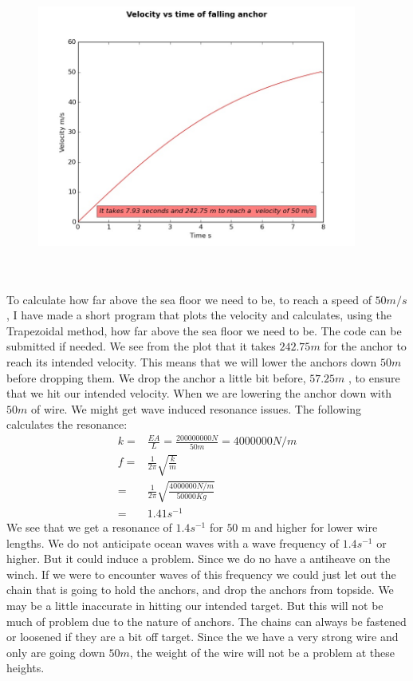 \documentclass[DIV=calc, paper=a4, fontsize=13pt, twocolumn]{scrartcl}	 %
\begin{document}
\begin{figure}[t]
\includegraphics[width=10.5cm,height=10cm]{velocity_plot.jpg}
\end{figure}
To calculate how far above the sea floor we need to be, to reach a speed of $50 m/s $, I have made a short program that plots the velocity and calculates, using the Trapezoidal method, how far above the sea floor we need to be. The code can be submitted if needed.
\newline
We see from the plot that it takes $242.75 m$ for the anchor to reach its intended velocity. This means that we will lower the anchors down $50 m$ before dropping them. We drop the anchor a little bit before, $57.25 m$ , to ensure that we hit our intended velocity.
\newline
When we are lowering the anchor down with $50 m$ of wire. We might get wave induced resonance issues. The following calculates the resonance:
\begin{align*}
k =& \frac{EA}{L} = \frac{200 000 000 N}{50 m} = 4 000 000 N/m \\
f =& \frac{1}{2\pi}\sqrt{\frac{k}{m}} \\
  =& \frac{1}{2\pi}\sqrt{\frac{4 000 000 N/m}{50 000 Kg }} \\
  =& 1.41 s^{-1}
\end{align*}
We see that we get a resonance of $1.4 s^{-1}$ for $50$ m and higher for lower wire lengths. We do not anticipate ocean waves with a wave frequency of $1.4 s^{-1}$ or higher. But it could induce a problem. Since we do no have a antiheave on the winch.
\newline
If we were to encounter waves of this frequency we could just let out the chain that is going to hold the anchors, and drop the anchors from topside.  We may be a little inaccurate in hitting our intended target. But this will not be much of problem due to the nature of anchors. The chains can always be fastened or loosened if they are a bit off target.
\newline
Since the we have a very strong wire and only are going down $50 m$, the weight of the wire will not be a problem at these heights.
\end{document}
